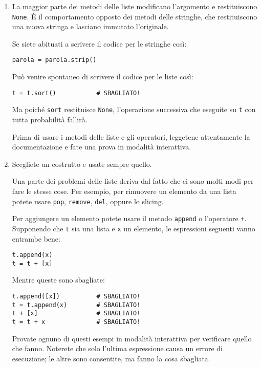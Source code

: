 \documentclass[10pt]{book}
\begin{document}
\begin{enumerate}

\item La maggior parte dei metodi delle liste modificano l'argomento e restituiscono {\tt None}.  È il comportamento opposto dei metodi delle stringhe, che restituiscono una nuova stringa e lasciano immutato l'originale.

Se siete abituati a scrivere il codice per le stringhe così:

\begin{verbatim}
parola = parola.strip()
\end{verbatim}

Può venire spontaneo di scrivere il codice per le liste così:

\begin{verbatim}
t = t.sort()           # SBAGLIATO!
\end{verbatim}

Ma poiché {\tt sort} restituisce {\tt None}, l'operazione successiva che eseguite su {\tt t} con tutta probabilità fallirà.

Prima di usare i metodi delle liste e gli operatori, leggetene attentamente la documentazione e fate una prova in modalità interattiva.


\item Scegliete un costrutto e usate sempre quello.

Una parte dei problemi delle liste deriva dal fatto che ci sono molti modi per fare le stesse cose. Per esempio, per rimuovere un elemento da una lista potete usare {\tt pop}, {\tt remove}, {\tt del}, oppure lo slicing.

Per aggiungere un elemento potete usare il metodo {\tt append} o l'operatore {\tt +}. Supponendo che {\tt t} sia una lista e {\tt x} un elemento, le espressioni seguenti vanno entrambe bene:

\begin{verbatim}
t.append(x)
t = t + [x]
\end{verbatim}

Mentre queste sono sbagliate:

\begin{verbatim}
t.append([x])          # SBAGLIATO!
t = t.append(x)        # SBAGLIATO!
t + [x]                # SBAGLIATO!
t = t + x              # SBAGLIATO!
\end{verbatim}

Provate ognuno di questi esempi in modalità interattiva per verificare quello che fanno. Noterete che solo l'ultima espressione causa un errore di esecuzione; le altre sono consentite, ma fanno la cosa sbagliata.



\end{enumerate}
\end{document}
